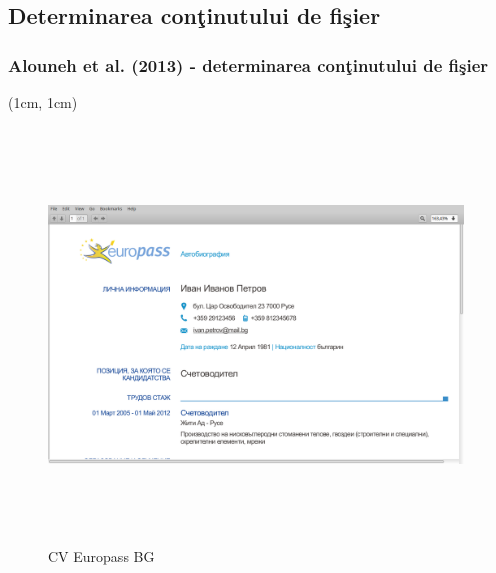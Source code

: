 \documentclass{beamer}
\theoremstyle{definition}
\begin{document}
\subsection{Determinarea con\c{t}inutului de fi\c{s}ier}
\begin{frame}
    \frametitle{Alouneh et al. (2013) - determinarea con\c{t}inutului de fi\c{s}ier}
     {
        \begin{center}
         \begin{textblock*}{4cm}(1cm, 1cm)
            \begin{figure}
                \includegraphics[width=11cm,height=11cm,keepaspectratio]{img/results/CV_BG.png}
                \caption{CV Europass BG}
           \end{figure}
        \end{textblock*} 
        \end{center}
    }
\end{frame}
\end{document}
